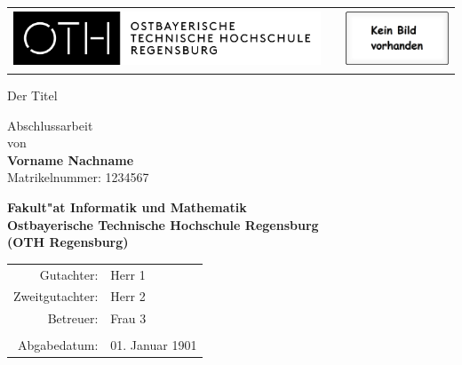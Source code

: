 %
%

\begin{titlepage}


\FloatBarrier
\begin{table}[htb]\vspace{1ex}\centering
\begin{tabular}{ccc}
 \includegraphics[height=1.7cm]{img/logo_OTH.png}
   &    &
 \includegraphics[height=1.7cm]{img/kein_bild_vorhanden.eps}
   \\
\end{tabular}
\end{table}
\FloatBarrier


\begin{center}
\rule{0pt}{0pt}
\vfill
\vfill
\vfill
\vfill

\begin{huge}
Der Titel  \\[0.75ex]
\end{huge}

\vfill
\vfill

Abschlussarbeit\\ von\\

\vspace*{.5cm}
\textbf{Vorname Nachname}\\
Matrikelnummer: 1234567
\vspace{.5cm}

\vfill
\vfill
\textbf{\large Fakult"at Informatik und Mathematik\\
Ostbayerische Technische Hochschule Regensburg\\
(OTH Regensburg)}
\vfill
\vfill

\begin{tabular}{rl}
Gutachter:   & Herr 1\\
Zweitgutachter:   & Herr 2\\
Betreuer:   & Frau 3\\
\\Abgabedatum:& 01. Januar 1901
\end{tabular}
\end{center}
\end{titlepage}


